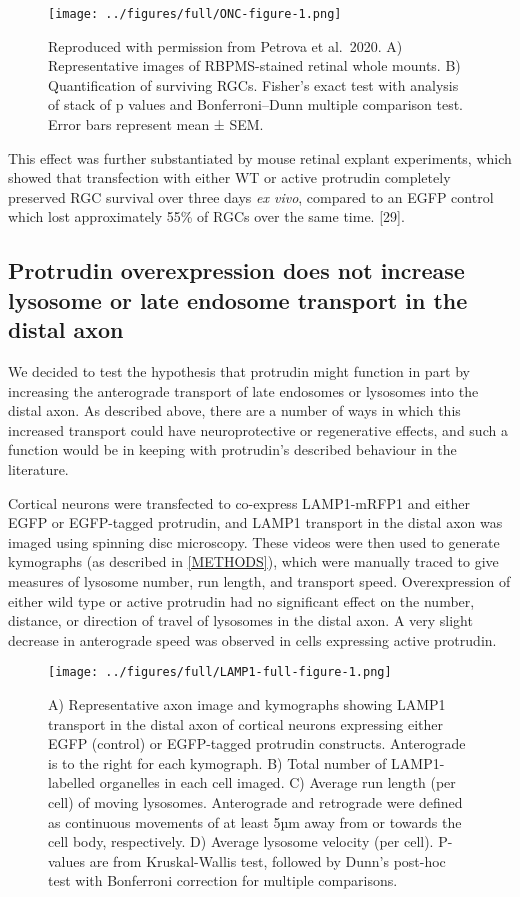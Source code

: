 \documentclass[
  12pt,
  a4paper,
]{book}
\begin{document}
\begin{figure}
\centering
\texttt{[image: ../figures/full/ONC-figure-1.png]}
\caption{\label{fig:ONC-figure}Reproduced with permission from Petrova et al.~2020. A) Representative images of RBPMS-stained retinal whole mounts. B) Quantification of surviving RGCs. Fisher's exact test with analysis of stack of p values and Bonferroni--Dunn multiple comparison test. Error bars represent mean ± SEM.}
\end{figure}

This effect was further substantiated by mouse retinal explant experiments, which showed that transfection with either WT or active protrudin completely preserved RGC survival over three days \emph{ex vivo}, compared to an EGFP control which lost approximately 55\% of RGCs over the same time. {[}29{]}.

\hypertarget{lyso-LE}{%
\subsection{Protrudin overexpression does not increase lysosome or late endosome transport in the distal axon}\label{lyso-LE}}

We decided to test the hypothesis that protrudin might function in part by increasing the anterograde transport of late endosomes or lysosomes into the distal axon. As described above, there are a number of ways in which this increased transport could have neuroprotective or regenerative effects, and such a function would be in keeping with protrudin's described behaviour in the literature.

Cortical neurons were transfected to co-express LAMP1-mRFP1 and either EGFP or EGFP-tagged protrudin, and LAMP1 transport in the distal axon was imaged using spinning disc microscopy. These videos were then used to generate kymographs (as described in \ref{METHODS}), which were manually traced to give measures of lysosome number, run length, and transport speed. Overexpression of either wild type or active protrudin had no significant effect on the number, distance, or direction of travel of lysosomes in the distal axon. A very slight decrease in anterograde speed was observed in cells expressing active protrudin.

\begin{figure}
\centering
\texttt{[image: ../figures/full/LAMP1-full-figure-1.png]}
\caption{\label{fig:LAMP1-full-figure}A) Representative axon image and kymographs showing LAMP1 transport in the distal axon of cortical neurons expressing either EGFP (control) or EGFP-tagged protrudin constructs. Anterograde is to the right for each kymograph. B) Total number of LAMP1-labelled organelles in each cell imaged. C) Average run length (per cell) of moving lysosomes. Anterograde and retrograde were defined as continuous movements of at least 5µm away from or towards the cell body, respectively. D) Average lysosome velocity (per cell). P-values are from Kruskal-Wallis test, followed by Dunn's post-hoc test with Bonferroni correction for multiple comparisons.}
\end{figure}
\end{document}
